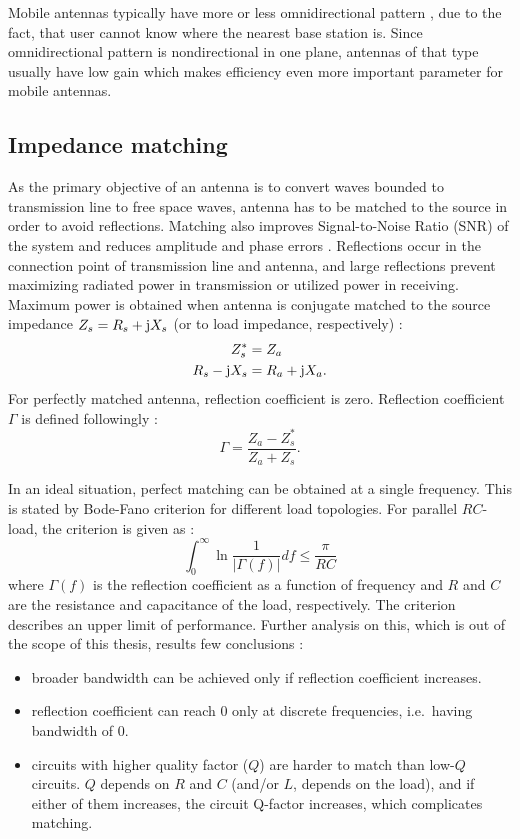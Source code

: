 Mobile antennas typically have more or less omnidirectional pattern \cite{ying_mobile_antennas}, due to the fact, that user cannot know where the nearest base station is. Since omnidirectional pattern is nondirectional in one plane, antennas of that type usually have low gain which makes efficiency even more important parameter for mobile antennas.

\subsection{Impedance matching}
\label{sec:matching}
As the primary objective of an antenna is to convert waves bounded to transmission line to free space waves, antenna has to be matched to the source in order to avoid reflections. Matching also improves Signal-to-Noise Ratio (SNR) of the system and reduces amplitude and phase errors \cite{pozar}. Reflections occur in the connection point of transmission line and antenna, and large reflections prevent maximizing radiated power in transmission or utilized power in receiving. Maximum power is obtained when antenna is conjugate matched to the source impedance $Z_s=R_s+\mathrm{j} X_s$ (or to load impedance, respectively) \cite{stutzman}:
\begin{align}
\label{eq:matching1}
    Z_s^* &= Z_a\\
\label{eq:matching2}
    R_s-\mathrm{j} X_s &= R_a+\mathrm{j} X_a.
\end{align}
For perfectly matched antenna, reflection coefficient is zero. Reflection coefficient $\Gamma$ is defined followingly \cite{stutzman}: 
\begin{equation}
\label{eq:reflection_coeff}
    \Gamma = \frac{Z_a-Z_s^*}{Z_a+Z_s}.
\end{equation}

In an ideal situation, perfect matching can be obtained at a single frequency. This is stated by Bode-Fano criterion for different load topologies. For parallel $RC$-load, the criterion is given as \cite{pozar}:
\begin{equation}
    \int_0^\infty\ln\frac{1}{|\Gamma(f)|}df\leq\frac{\pi}{RC}
\end{equation}
where $\Gamma(f)$ is the reflection coefficient as a function of frequency and $R$ and $C$ are the resistance and capacitance of the load, respectively. The criterion describes an upper limit of performance. Further analysis on this, which is out of the scope of this thesis, results few conclusions \cite{pozar}:
\begin{itemize}
    \item broader bandwidth can be achieved only if reflection coefficient increases.
    \item reflection coefficient can reach 0 only at discrete frequencies, i.e.\ having bandwidth of 0.
    \item circuits with higher quality factor ($Q$) are harder to match than low-$Q$ circuits. $Q$ depends on $R$ and $C$ (and/or $L$, depends on the load), and if either of them increases, the circuit Q-factor increases, which complicates matching.
\end{itemize}

